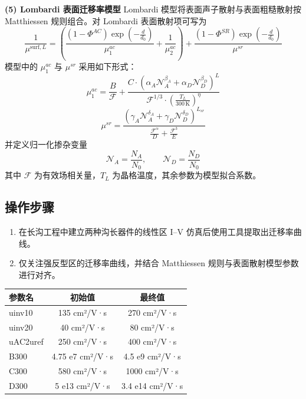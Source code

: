 \documentclass[12pt, a4paper, UTF8]{article}
\begin{document}
\noindent\textbf{(5) Lombardi 表面迁移率模型}
Lombardi 模型将表面声子散射与表面粗糙散射按 Matthiessen 规则组合。对 Lombardi 表面散射项可写为
\begin{equation}
\frac{1}{\mu^{\mathrm{surf},L}}=
\left(\frac{(1-\Phi^{AC})\exp\left(-\frac{d}{d_0}\right)}{\mu_1^{ac}}+\frac{1}{\mu_2^{ac}}\right)
+\frac{(1-\Phi^{SR})\exp\left(-\frac{d}{d_0}\right)}{\mu^{sr}}
\end{equation}
模型中的 $\mu_1^{ac}$ 与 $\mu^{sr}$ 采用如下形式：
\begin{equation}
\mu_1^{ac}=\frac{B}{\mathcal{F}}+\frac{C\cdot\left(\alpha_A\mathcal{N}_A^{\beta_A}+\alpha_D\mathcal{N}_D^{\beta_D}\right)^{L}}{\mathcal{F}^{1/3}\cdot\left(\frac{T_L}{300\,\mathrm{K}}\right)^{\eta}}
\end{equation}
\begin{equation}
\mu^{sr}=\frac{\left(\gamma_A\mathcal{N}_A^{\delta_A}+\gamma_D\mathcal{N}_D^{\delta_D}\right)^{L_{sr}}}{\frac{\mathcal{F}^{\alpha}}{D}+\frac{\mathcal{F}^{3}}{E}}
\end{equation}
并定义归一化掺杂变量
\begin{equation}
\mathcal{N}_A=\frac{N_A}{N_0},\qquad \mathcal{N}_D=\frac{N_D}{N_0}
\end{equation}
其中 $\mathcal{F}$ 为有效场相关量，$T_L$ 为晶格温度，其余参数为模型拟合系数。

\subsection{操作步骤}
\begin{enumerate}
    \item 在长沟工程中建立两种沟长器件的线性区 I--V 仿真后使用工具提取出迁移率曲线。
    \item 仅关注强反型区的迁移率曲线，并结合 Matthiessen 规则与表面散射模型参数进行对齐。
\end{enumerate}

\begin{table}[H]
    \centering
    \large
    \begin{tabular}{lcc} %
        \toprule
        \textbf{参数名} & \textbf{初始值} & \textbf{最终值} \\
        \midrule
        uinv10 & 135 cm²/V·s & 270 cm²/V·s \\
        uinv20 & 40 cm²/V·s & 80 cm²/V·s \\
        uAC2uref & 250 cm²/V·s & 400 cm²/V·s \\
        B300 & 4.75 e7 cm²/V·s & 4.5 e9 cm²/V·s\\
        C300 &580 cm²/V·s & 1000 cm²/V·s\\
        D300 & 5 e13 cm²/V·s & 3.4 e14 cm²/V·s\\
        \bottomrule
    \end{tabular}
\end{table}
\end{document}
